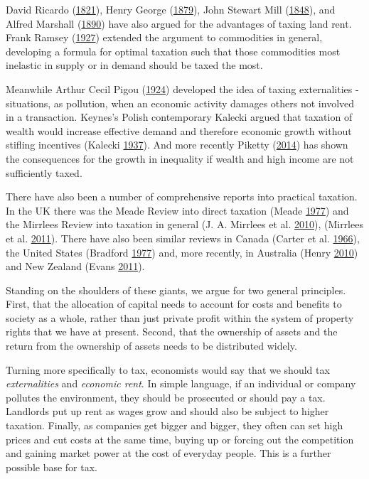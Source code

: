 \documentclass[]{tufte-handout}
\begin{document}
David Ricardo (\protect\hyperlink{ref-ricardo1821principles}{1821}),
Henry George (\protect\hyperlink{ref-George1879}{1879}), John Stewart
Mill (\protect\hyperlink{ref-mill1848principles}{1848}), and Alfred
Marshall (\protect\hyperlink{ref-marshall1890principles}{1890}) have
also argued for the advantages of taxing land rent. Frank Ramsey
(\protect\hyperlink{ref-Ramsey1927}{1927}) extended the argument to
commodities in general, developing a formula for optimal taxation such
that those commodities most inelastic in supply or in demand should be
taxed the most.

Meanwhile Arthur Cecil Pigou (\protect\hyperlink{ref-Pigou1924}{1924})
developed the idea of taxing externalities - situations, as pollution,
when an economic activity damages others not involved in a transaction.
Keynes's Polish contemporary Kalecki argued that taxation of wealth
would increase effective demand and therefore economic growth without
stifling incentives (Kalecki \protect\hyperlink{ref-Kalecki1937}{1937}).
And more recently Piketty (\protect\hyperlink{ref-Piketty2014a}{2014})
has shown the consequences for the growth in inequality if wealth and
high income are not sufficiently taxed.

There have also been a number of comprehensive reports into practical
taxation. In the UK there was the Meade Review into direct taxation
(Meade \protect\hyperlink{ref-Meade1977}{1977}) and the Mirrlees Review
into taxation in general (J. A. Mirrlees et al.
\protect\hyperlink{ref-Mirrlees2010d}{2010}), (Mirrlees et al.
\protect\hyperlink{ref-Mirrlees2011}{2011}). There have also been
similar reviews in Canada (Carter et al.
\protect\hyperlink{ref-Carter1966}{1966}), the United States (Bradford
\protect\hyperlink{ref-Bradford1977}{1977}) and, more recently, in
Australia (Henry \protect\hyperlink{ref-Henry2010}{2010}) and New
Zealand (Evans \protect\hyperlink{ref-evans2011reflections}{2011}).

Standing on the shoulders of these giants, we argue for two general
principles. First, that the allocation of capital needs to account for
costs and benefits to society as a whole, rather than just private
profit within the system of property rights that we have at present.
Second, that the ownership of assets and the return from the ownership
of assets needs to be distributed widely.

Turning more specifically to tax, economists would say that we should
tax \emph{externalities} and \emph{economic rent}. In simple language,
if an individual or company pollutes the environment, they should be
prosecuted or should pay a tax. Landlords put up rent as wages grow and
should also be subject to higher taxation. Finally, as companies get
bigger and bigger, they often can set high prices and cut costs at the
same time, buying up or forcing out the competition and gaining market
power at the cost of everyday people. This is a further possible base
for tax.
\end{document}
